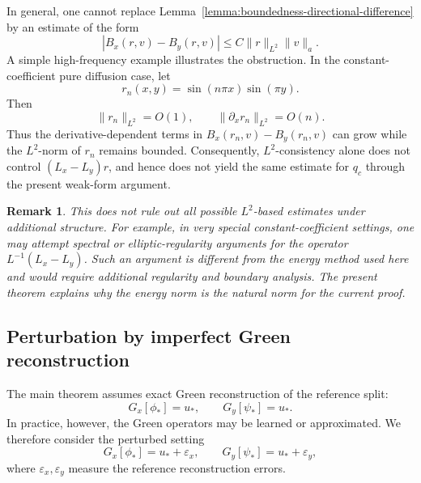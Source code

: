 \documentclass[11pt]{article}
\newtheorem{remark}{Remark}
\begin{document}
In general, one cannot replace Lemma~\ref{lemma:boundedness-directional-difference}
by an estimate of the form
\[
    |B_x(r,v)-B_y(r,v)|
    \le
    C\|r\|_{L^2}\|v\|_a.
\]
A simple high-frequency example illustrates the obstruction.  In the
constant-coefficient pure diffusion case, let
\[
    r_n(x,y)=\sin(n\pi x)\sin(\pi y).
\]
Then
\[
    \|r_n\|_{L^2}=O(1),
    \qquad
    \|\partial_x r_n\|_{L^2}=O(n).
\]
Thus the derivative-dependent terms in \(B_x(r_n,v)-B_y(r_n,v)\) can
grow while the \(L^2\)-norm of \(r_n\) remains bounded.  Consequently,
\(L^2\)-consistency alone does not control \((L_x-L_y)r\), and hence does
not yield the same estimate for \(q_c\) through the present weak-form
argument.

\begin{remark}
This does not rule out all possible \(L^2\)-based estimates under
additional structure.  For example, in very special constant-coefficient
settings, one may attempt spectral or elliptic-regularity arguments for
the operator \(L^{-1}(L_x-L_y)\).  Such an argument is different from the
energy method used here and would require additional regularity and
boundary analysis.  The present theorem explains why the energy norm is
the natural norm for the current proof.
\end{remark}

\subsection{Perturbation by imperfect Green reconstruction}
\label{subsec:imperfect-green-reconstruction}

The main theorem assumes exact Green reconstruction of the reference
split:
\[
    G_x[\phi_*]=u_*,
    \qquad
    G_y[\psi_*]=u_*.
\]
In practice, however, the Green operators may be learned or approximated.
We therefore consider the perturbed setting
\begin{equation}
    G_x[\phi_*]=u_*+\varepsilon_x,
    \qquad
    G_y[\psi_*]=u_*+\varepsilon_y,
    \label{eq:imperfect-green-reconstruction}
\end{equation}
where \(\varepsilon_x,\varepsilon_y\) measure the reference
reconstruction errors.
\end{document}
